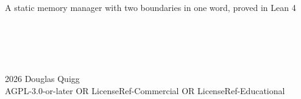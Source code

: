 \begin{titlepage}
  \centering
  \vfill
  {\Large{}} \\
  \vspace{0.8cm}
  {\large A static memory manager with two boundaries in one word, proved in Lean 4} \\
  \vspace{2cm}
   \\
  \vspace{1cm}
  {\large{}} \\
  \vfill
   \\
   \\
  \vfill
   \\
  \vfill
  {\footnotesize \textcopyright{} 2026 Douglas Quigg \\
  AGPL-3.0-or-later OR LicenseRef-Commercial OR LicenseRef-Educational}
\end{titlepage}
